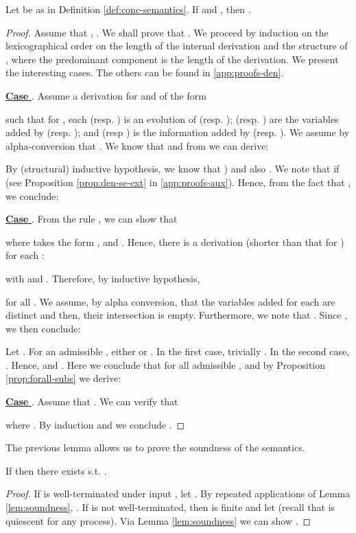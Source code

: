 \documentclass{tlp}
\begin{document}
\begin{lemma}[Soundness]\label{lem:soundness}
Let  be as in Definition \ref{def:conc-semantics}.
If  and ,  then .
\end{lemma}
\begin{proof}
Assume that ,  .
 We shall prove that . 
	We proceed by induction on the lexicographical order on the length of the internal derivation   and the structure of  , where the predominant component is the length of the derivation. We present the interesting cases. The others can be found in \ref{app:proofs-den}. 

	
\noindent \underline{{\bf Case}  }.   Assume a derivation for  and  of the form
	
	such that for , each  (resp. ) is an evolution of  (resp.  );
	 (resp. ) are the variables added by  (resp. ); and  (resp )
	is the information added by  (resp. ). We assume by alpha-conversion that . 
	We know that   and from  we can derive:
	
	By (structural) inductive hypothesis, we know that  ) and also   . We note that   if  (see Proposition \ref{prop:den-se-ext} in \ref{app:proofs-aux}). Hence,  from the fact that   ,  we conclude: 
	 
\noindent \underline{{\bf Case}  }.   From the rule , we can show that

where   takes the form 
,  and . Hence, there is a  derivation (shorter than that for ) for each :

with  and 
. 
Therefore, by  inductive hypothesis, 

 for all . We assume, by alpha conversion,  that the variables added for each    are distinct and then, their intersection is empty.   Furthermore, we note that . Since  , we then conclude: 

Let . 
	  For an admissible 
	  , either  or . In the first case, trivially 
	  . In the second case, 
	   . Hence,    and   . 
	   Here we conclude that for all admissible ,  and by   Proposition \ref{prop:forall-subs} we derive:
	  

\noindent \underline{{\bf Case}  }. Assume that 
.    We can verify that 

where . 
By induction   and we conclude 
. \end{proof}

The previous lemma allows us to prove the soundness of the semantics. 
\begin{theorem}[Soundness]\label{theo:sound}
If  then there exists  s.t. . 
\end{theorem}
\begin{proof}
If  is well-terminated under input , let . By repeated applications of Lemma \ref{lem:soundness}, . If  is not well-terminated, then  is finite and let 
(recall that  is quiescent for any process). Via Lemma \ref{lem:soundness} we can show .
\end{proof}
\end{document}
